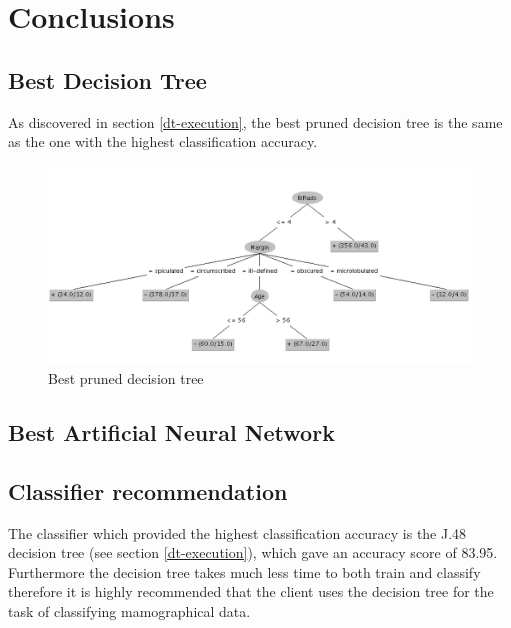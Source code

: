 \documentclass[12pt]{article}
\begin{document}
\section{Conclusions}
  \subsection{Best Decision Tree}
    As discovered in section \ref{dt-execution}, the best pruned decision tree is the same as the one with the highest classification accuracy.



    \begin{figure}[H]
      \centering
      \includegraphics[width=\textwidth]{best-pruned-tree}
      \caption{Best pruned decision tree}
      \label{fig:best-pruned-tree}
    \end{figure}


  \subsection{Best Artificial Neural Network}



  \subsection{Classifier recommendation}
    The classifier which provided the highest classification accuracy is the J.48 decision tree (see section \ref{dt-execution}), which gave an accuracy score of 83.95. Furthermore the decision tree takes much less time to both train and classify therefore it is highly recommended that the client uses the decision tree for the task of classifying mamographical data.
\end{document}
